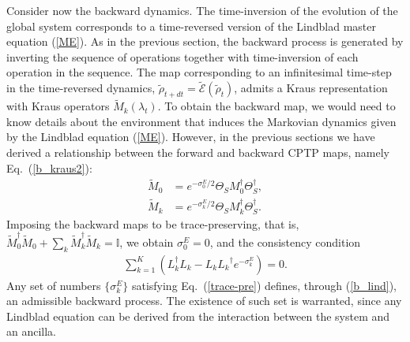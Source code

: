 \documentclass[aps,prx,twocolumn,showpacs,floatfix,superscriptaddress,graphics,longbibliography]{revtex4-1}
\newcommand{\E}{{\mathcal E}}
\newcommand{\HAT}{}
\begin{document}
Consider now the backward dynamics. The time-inversion of the evolution of the global system  corresponds to a time-reversed version of the Lindblad master equation (\ref{ME}). 
As in the previous section, the backward process is generated by inverting the sequence of operations together with time-inversion of each operation in the sequence. 
The map corresponding to an infinitesimal time-step in the time-reversed dynamics, $\tilde{\rho}_{t + dt} = \tilde{\E}(\tilde{\rho}_t)$, admits a Kraus representation with 
Kraus operators $\tilde{M}_{k}(\lambda_t)$. To obtain the backward map, we would need to know details about the environment that induces the Markovian dynamics given by the Lindblad equation (\ref{ME}). However, in the previous sections we have derived a relationship between the forward and backward CPTP maps, namely  Eq.~(\ref{b_kraus2}):
\begin{align} \label{b_lind}
 \HAT{\tilde{M}}_{0} & = e^{-\sigma^E_{0}/2} \HAT{\Theta}_S \HAT{M}_{0}^{\dagger} \HAT{\Theta}_S^\dagger, \\ 
 \HAT{\tilde{M}}_{k} & = e^{-\sigma^E_{k}/2} \HAT{\Theta}_S \HAT{M}_{k}^{\dagger}\HAT{\Theta}_S^\dagger.
\end{align}
Imposing the backward maps to be trace-preserving, that is, $\tilde M_0^\dagger \tilde M_0+\sum_k \tilde M_k^\dagger \tilde M_k=\mathbb{I}$, we obtain $\sigma_0^E = 0$, and the consistency condition
\begin{eqnarray}\label{trace-pre}
 \sum_{k=1}^K \left(\HAT{L}_k^\dagger \HAT{L}_k -\HAT{L}_k \HAT{L_k}^\dagger e^{-\sigma_{k}^E} \right) = 0.
\end{eqnarray}
Any set of numbers $\{ \sigma_{k}^E\}$ satisfying Eq.~(\ref{trace-pre}) defines, through (\ref{b_lind}), an admissible backward process. The existence of such set is warranted, since any Lindblad equation can be derived from the interaction between the system and an ancilla.
\end{document}
